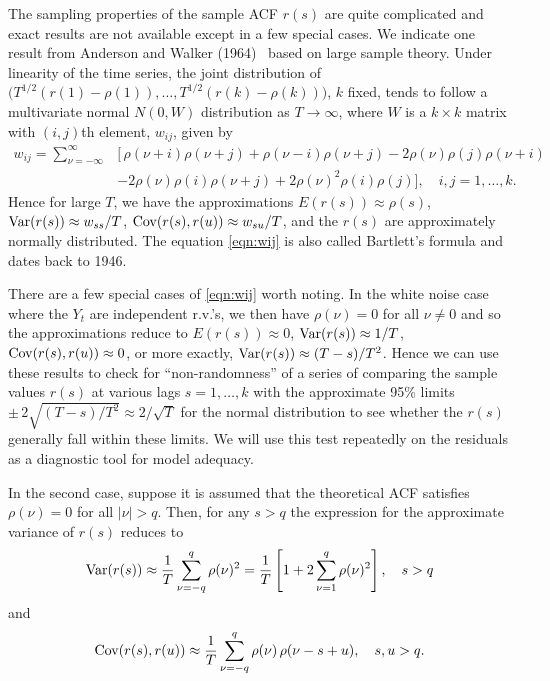 The sampling properties of the sample ACF $r(s)$ are quite complicated and exact results are not available except in a few special cases. We indicate one result from Anderson and Walker (1964)~\cite{anderwalk} based on large sample theory. Under linearity of the time series, the joint distribution of $\big(T^{1/2} (r(1) - \rho(1) ), \ldots, T^{1/2} (r(k) - \rho(k) ) \big)$, $k$ fixed, tends to follow a multivariate normal $N(0, W)$ distribution as $T \to \infty$, where $W$ is a $k \times k$ matrix with $(i,j)$th element, $w_{ij}$, given by
	\begin{equation} \label{eqn:wij}
	\begin{split}
	w_{ij}= \sum_{\nu= -\infty}^\infty & [\, \rho(\nu + i ) \rho(\nu + j) + \rho(\nu - i) \rho(\nu + j) - 2 \rho(\nu) \rho(j) \rho(\nu + i)  \\
	&- 2 \rho(\nu) \rho(i) \rho(\nu + j) + 2 \rho(\nu)^2 \rho(i) \rho(j)], \quad  i, j= 1,\ldots, k.
        \end{split}
	\end{equation}
Hence for large $T$, we have the approximations $E(r(s)) \approx \rho(s)$, $\operatorname{Var}(r(s)) \approx w_{ss}/T$, $\operatorname{Cov}(r(s), r(u)) \approx w_{su}/T$, and the $r(s)$ are approximately normally distributed. The equation \eqref{eqn:wij} is also called Bartlett's formula and dates back to 1946.


There are a few special cases of \eqref{eqn:wij} worth noting. In the white noise case where the $Y_t$ are independent r.v.'s, we then have $\rho(\nu)= 0$ for all $\nu \neq 0$ and so the approximations reduce to $E(r(s)) \approx 0$, $\operatorname{Var}(r(s)) \approx 1/T$, $\operatorname{Cov}(r(s), r(u)) \approx 0$, or more exactly, $\operatorname{Var}(r(s)) \approx (T-s)/T^2$. Hence we can use these results to check for ``non-randomness'' of a series of comparing the sample values $r(s)$ at various lags $s=1, \ldots, k$ with the approximate 95\% limits $\pm \, 2 \sqrt{(T-s)/T^2} \approx 2 / \sqrt{T}$ for the normal distribution to see whether the $r(s)$ generally fall within these limits. We will use this test repeatedly on the residuals as a diagnostic tool for model adequacy. 


In the second case, suppose it is assumed that the theoretical ACF satisfies $\rho(\nu) = 0$ for all $|\nu| > q$.  Then, for any $s > q$ the expression for the approximate variance of $r(s)$ reduces to
	\begin{equation} \label{eqn:varrs}
	\var(r(s)) \approx \dfrac{1}{T} \sum_{\nu=-q}^q \rho(\nu)^2= \dfrac{1}{T} \left[ 1 + 2 \sum_{\nu=1}^q \rho(\nu)^2 \right], \quad s > q 
	\end{equation}        
and
	\[
	\operatorname{Cov}(r(s), r(u)) \approx \frac{1}{T} \sum_{\nu = -q}^{q} \rho(\nu)\, \rho(\nu - s + u), \quad s,u > q.
	 \]

